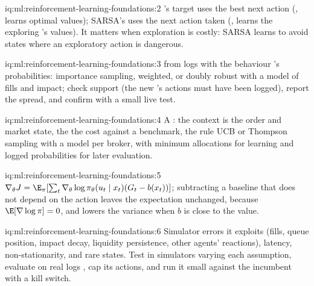 \begin{solution}{iq:ml:reinforcement-learning-foundations:2}
's target uses the best next action (, learns optimal values); SARSA's uses the next action taken
(, learns the exploring 's values). It matters when exploration is costly: SARSA learns to avoid states where
an exploratory action is dangerous.
\end{solution}

\begin{solution}{iq:ml:reinforcement-learning-foundations:3}
 from logs with the behaviour 's probabilities: importance sampling, weighted, or doubly robust with
a model of fills and impact; check support (the new 's actions must have been logged), report the spread, and confirm
with a small live test.
\end{solution}

\begin{solution}{iq:ml:reinforcement-learning-foundations:4}
A : the context is the order and market state, the  the cost against a benchmark, the rule UCB or
Thompson sampling with a  model per broker, with minimum allocations for learning and logged probabilities for later
evaluation.
\end{solution}

\begin{solution}{iq:ml:reinforcement-learning-foundations:5}
$\nabla_\theta J = \E_\pi[\sum_t\nabla_\theta\log\pi_\theta(u_t\mid x_t)(G_t - b(x_t))]$; subtracting a baseline that does
not depend on the action leaves the expectation unchanged, because $\E[\nabla\log\pi] = 0$, and lowers the variance when $b$
is close to the value.
\end{solution}

\begin{solution}{iq:ml:reinforcement-learning-foundations:6}
Simulator errors it exploits (fills, queue position, impact decay, liquidity persistence, other agents' reactions), latency,
non-stationarity, and rare states. Test in simulators varying each assumption, evaluate on real logs , cap its
actions, and run it small against the incumbent with a kill switch.
\end{solution}
